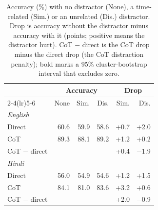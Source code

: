 \begin{table}[t]
\centering
\small
\setlength{\tabcolsep}{4pt}
\begin{tabular}{lrrrrr}
\toprule
 & \multicolumn{3}{c}{Accuracy} & \multicolumn{2}{c}{Drop} \\
\cmidrule(lr){2-4}\cmidrule(lr){5-6}
 & None & Sim. & Dis. & Sim. & Dis. \\
\midrule
\multicolumn{6}{l}{\textit{English}} \\
\quad Direct & 60.6 & 59.9 & 58.6 & +0.7 & +2.0 \\
\quad CoT & 89.3 & 88.1 & 89.2 & +1.2 & +0.2 \\
\quad CoT $-$ direct &  &  &  & +0.4 & $-$1.9 \\
\midrule
\multicolumn{6}{l}{\textit{Hindi}} \\
\quad Direct & 56.0 & 54.9 & 54.6 & +1.2 & +1.5 \\
\quad CoT & 84.1 & 81.0 & 83.6 & +3.2 & +0.6 \\
\quad CoT $-$ direct &  &  &  & +2.0 & $-$0.9 \\
\bottomrule
\end{tabular}
\caption{Accuracy (\%) with no distractor (None), a time-related (Sim.) or an unrelated (Dis.) distractor. Drop is accuracy without the distractor minus accuracy with it (points; positive means the distractor hurt). CoT $-$ direct is the CoT drop minus the direct drop (the CoT distraction penalty); bold marks a 95\% cluster-bootstrap interval that excludes zero.}
\label{tab:distractor}
\end{table}

